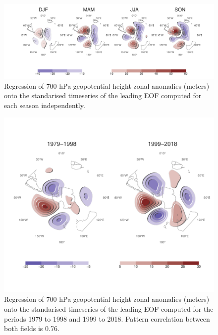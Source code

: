 \documentclass[]{ametsocV5}
\begin{document}
\begin{figure}
\includegraphics{A10-1} \caption[Regression of 700 hPa geopotential height zonal anomalies (meters) onto the standarised timeseries of the leading EOF computed for each season independently]{Regression of 700 hPa geopotential height zonal anomalies (meters) onto the standarised timeseries of the leading EOF computed for each season independently.}\label{fig:A10}
\end{figure}

\begin{figure}
\includegraphics{A11-1} \caption[Regression of 700 hPa geopotential height zonal anomalies (meters) onto the standarised timeseries of the leading EOF computed for the periods 1979 to 1998 and 1999 to 2018]{Regression of 700 hPa geopotential height zonal anomalies (meters) onto the standarised timeseries of the leading EOF computed for the periods 1979 to 1998 and 1999 to 2018. Pattern correlation between both fields is 0.76.}\label{fig:A11}
\end{figure}
\end{document}
